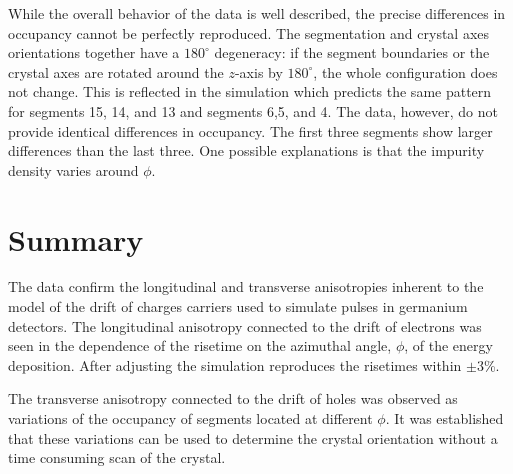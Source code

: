 While the overall behavior of the data is well described, the precise
differences in occupancy cannot be perfectly reproduced. The
segmentation and crystal axes orientations together have a
$180^{\circ}$ degeneracy: if the segment boundaries or the crystal
axes are rotated around the $z$-axis by $180^{\circ}$, the whole
configuration does not change. This is reflected in the simulation
which predicts the same pattern for segments 15, 14, and 13 and
segments 6,5, and 4. The data, however, do not provide identical
differences in occupancy. The first three segments show larger
differences than the last three. One possible explanations is that the
impurity density varies around $\phi$.


\section{Summary}
\label{sec:psa:sum}
The data confirm the longitudinal and transverse anisotropies inherent
to the model of the drift of charges carriers used to simulate pulses
in germanium detectors.  The longitudinal anisotropy connected to the
drift of electrons was seen in the dependence of the risetime on the
azimuthal angle, $\phi$, of the energy deposition. After adjusting the
simulation reproduces the risetimes within $\pm$3\%.

The transverse anisotropy connected to the drift of holes was observed
as variations of the occupancy of segments located at different
$\phi$. It was established that these variations can be used to
determine the crystal orientation without a time consuming scan of the
crystal.



